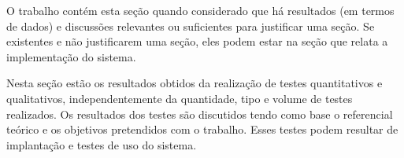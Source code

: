 O trabalho contém esta seção quando considerado que há resultados (em termos de dados) e discussões relevantes ou suficientes para justificar uma seção. Se existentes e não justificarem uma seção, eles podem estar na seção que relata a implementação do sistema.

Nesta seção estão os resultados obtidos da realização de testes quantitativos e qualitativos, independentemente da quantidade, tipo e volume de testes realizados. Os resultados dos testes são discutidos tendo como base o referencial teórico e os objetivos pretendidos com o trabalho. Esses testes podem resultar de implantação e testes de uso do sistema.
